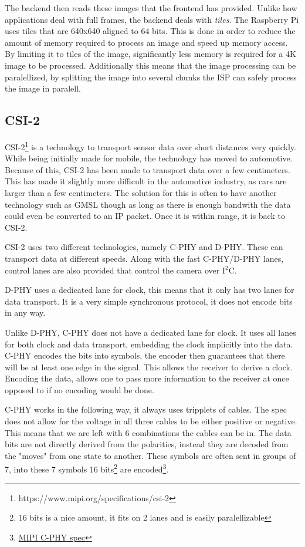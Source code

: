 The backend then reads these images that the frontend has provided. Unlike how
applications deal with full frames, the backend deals with \textit{tiles}. The
Raspberry Pi uses tiles that are 640x640 aligned to 64 bits. This is done in
order to reduce the amount of memory required to process an image and speed up
memory access. By limiting it to tiles of the image, significantly less memory
is required for a 4K image to be processed. Additionally this means that the
image processing can be paralellized, by splitting the image into several
chunks the ISP can safely process the image in paralell.


\subsection{CSI-2}
CSI-2\footnote{https://www.mipi.org/specifications/csi-2} is a technology to
transport sensor data over short distances very quickly. While being initially
made for mobile, the technology has moved to automotive. Because of this, CSI-2
has been made to transport data over a few centimeters. This has made it
slightly more difficult in the automotive industry, as cars are larger than a
few centimeters. The solution for this is often to have another technology such
as GMSL though as long as there is enough bandwith the data could even be
converted to an IP packet. Once it is within range, it is back to CSI-2.

CSI-2 uses two different technologies, namely C-PHY and D-PHY. These can
transport data at different speeds. Along with the fast C-PHY/D-PHY lanes,
control lanes are also provided that control the camera over I$^2$C.

D-PHY uses a dedicated lane for clock, this means that it only has two lanes for
data transport. It is a very simple synchronous protocol, it does not encode
bits in any way.

Unlike D-PHY, C-PHY does not have a dedicated lane for clock. It uses all lanes
for both clock and data transport, embedding the clock implicitly into the
data. C-PHY encodes the bits into symbols, the encoder then guarantees that
there will be at least one edge in the signal. This allows the receiver to
derive a clock. Encoding the data, allows one to pass more information to the
receiver at once opposed to if no encoding would be done.

C-PHY works in the following way, it always uses tripplets of cables. The spec
does not allow for the voltage in all three cables to be either positive or
negative. This means that we are left with 6 combinations the cables can be in.
The data bits are not directly derived from the polarities, instead they are
decoded from the "moves" from one state to another. These symbols are often
sent in groups of 7, into these 7 symbols 16 bits\footnote{16 bits is a nice
amount, it fits on 2 lanes and is easily paralellizable} are encoded\footnote{\href{https://www.mipi.org/specifications/c-phy}{MIPI C-PHY spec}}.

